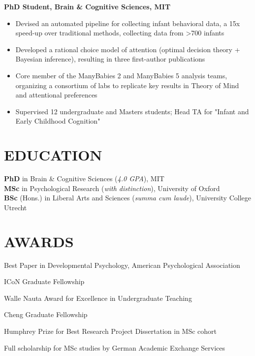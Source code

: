 \documentclass[11pt]{article}
\begin{document}
 \textbf{PhD Student, Brain \& Cognitive Sciences, MIT}
  \vspace{-0.2cm}
\begin{itemize}[itemsep=1pt]
    \item Devised an automated pipeline for collecting infant behavioral data, a 15x speed-up over traditional methods, collecting data from >700 infants
    \item Developed a rational choice model of attention (optimal decision theory + Bayesian inference), resulting in three first-author publications
    \item Core member of the ManyBabies 2 and ManyBabies 5 analysis teams, organizing a consortium of labs to replicate key results in Theory of Mind and attentional preferences
    \item Supervised 12 undergraduate and Masters students; Head TA for "Infant and Early Childhood Cognition"
\end{itemize}

\section*{EDUCATION}

 \textbf{PhD} in Brain \& Cognitive Sciences (\textit{4.0 GPA}), MIT \\
 \textbf{MSc} in Psychological Research (\textit{with distinction}), University of Oxford \\
 \textbf{BSc} (Hons.) in Liberal Arts and Sciences (\textit{summa cum laude}), University College Utrecht

\section*{AWARDS}

 Best Paper in Developmental Psychology, American Psychological Association

 ICoN Graduate Fellowship

 Walle Nauta Award for Excellence in Undergraduate Teaching

 Cheng Graduate Fellowship

 Humphrey Prize for Best Research Project Dissertation in MSc cohort

 Full scholarship for MSc studies by German Academic Exchange Services
\end{document}
